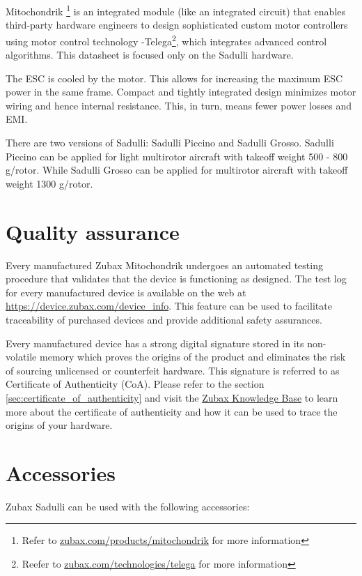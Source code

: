 \documentclass{zubaxdoc}
\begin{document}
Mitochondrik \footnote{Refer to \url{zubax.com/products/mitochondrik} for more information} is an integrated module (like an integrated circuit) that enables third-party hardware engineers to design sophisticated custom motor controllers using motor control technology -Telega\footnote{Reefer to \url{zubax.com/technologies/telega} for more information}, which integrates advanced control algorithms.   
This datasheet is focused only on the Sadulli hardware.
  
The ESC is cooled by the motor. This allows for increasing the maximum ESC power in the same frame. Compact and tightly integrated design minimizes motor wiring and hence internal resistance. This, in turn, means fewer power losses and EMI. 

There are two versions of Sadulli: Sadulli Piccino and Sadulli Grosso. 
Sadulli Piccino can be applied for light multirotor aircraft with takeoff weight 500 - 800  g/rotor. While Sadulli Grosso can be applied for multirotor aircraft with  takeoff weight 1300 g/rotor. 

\section{Quality assurance}

Every manufactured Zubax Mitochondrik undergoes an automated testing procedure that validates that
the device is functioning as designed.
The test log for every manufactured device is available on the web at
\url{https://device.zubax.com/device_info}.
This feature can be used to facilitate traceability of purchased devices and
provide additional safety assurances.

Every manufactured device has a strong digital signature stored in its non-volatile memory
which proves the origins of the product and eliminates the risk of sourcing unlicensed or
counterfeit hardware.
This signature is referred to as Certificate of Authenticity (CoA).
Please refer to the section \ref{sec:certificate_of_authenticity} and visit the
\href{https://kb.zubax.com}{Zubax Knowledge Base} to learn more about
the certificate of authenticity and how it can be used to trace the origins of your hardware.


\section{Accessories}

Zubax Sadulli can be used with the following accessories:
\end{document}

